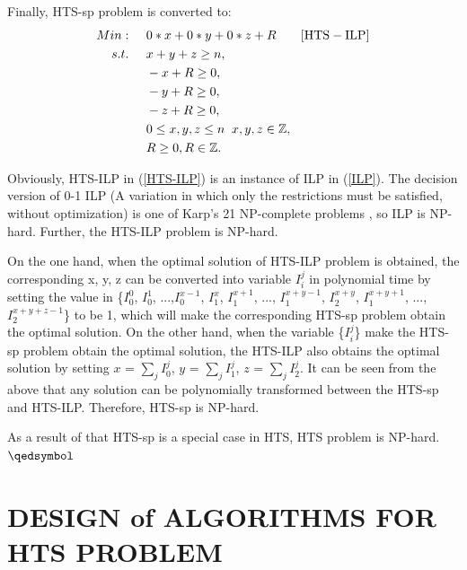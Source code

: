 \documentclass[conference]{IEEEtran}
\begin{document}
Finally, HTS-sp problem is converted to:
\begin{align}
Min:&\;\;\;\;\;0*x+0*y+0*z+R\;\;\;\;\;\;\;[\rm{HTS-ILP}]\label{HTS-ILP}\\
s.t. 
&\;\;\;\;\;x + y + z \geq n,\;\nonumber\\
&\;\;\;\;\;-x + R \geq 0, \nonumber\\
&\;\;\;\;\;-y + R \geq 0, \nonumber\\
&\;\;\;\;\;-z + R \geq 0, \nonumber\\
&\;\;\;\;\;0 \leq x, y, z \leq n  \;\;x, y, z\in\mathbb{Z},\nonumber\\
&\;\;\;\;\;R \geq 0, R\in\mathbb{Z}.\nonumber
\end{align}

Obviously, HTS-ILP in (\ref{HTS-ILP}) is an instance of ILP in (\ref{ILP}). The decision version of 0-1 ILP (A variation in which only the restrictions must be satisfied, without optimization) is one of Karp's 21 NP-complete problems  \cite{b9}, so ILP is NP-hard. Further, the HTS-ILP problem is NP-hard.

On the one hand, when the optimal solution of HTS-ILP problem is obtained, the corresponding {x, y, z} can be converted into variable {$I_i^j$} in polynomial time by setting the value in \{$I_0^0$, $I_0^1$, ...,$I_0^{x-1}$, $I_1^{x}$, $I_1^{x+1}$, ..., $I_1^{x+y-1}$, $I_2^{x+y}$, $I_1^{x+y+1}$, ..., $I_2^{x+y+z-1}$\} to be 1, which will make the corresponding HTS-sp problem obtain the optimal solution. On the other hand, when the variable \{$I_i^j$\} make the HTS-sp problem obtain the optimal solution, the HTS-ILP also obtains the optimal solution by setting $x$ = $\sum_{j}I_0^j$, $y$ = $\sum_{j}I_1^j$, $z$ = $\sum_{j}I_2^j$. It can be seen from the above that any solution can be polynomially transformed between the HTS-sp and HTS-ILP. Therefore, HTS-sp is NP-hard. 

As a result of that HTS-sp is a special case in HTS, HTS problem is NP-hard.\hfill $\qedsymbol$

\section{DESIGN of ALGORITHMS FOR HTS PROBLEM}\label{DESIGN_ALGORITHM}
\end{document}
